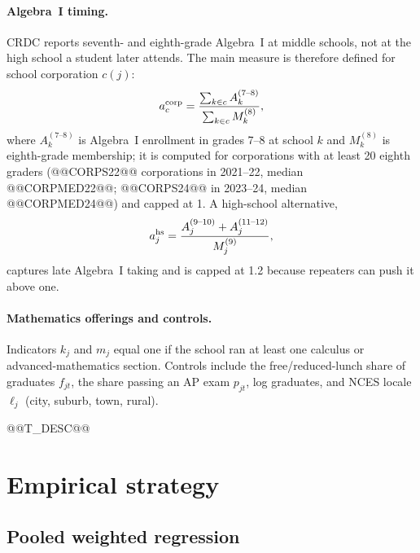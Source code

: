 \documentclass[aps,prd,reprint,superscriptaddress,nofootinbib,floatfix]{revtex4-2}
\begin{document}
\paragraph*{Algebra~I timing.} CRDC reports seventh- and eighth-grade Algebra~I at middle schools, not at the high school a student later attends. The main measure is therefore defined for school corporation $c(j)$:
\begin{equation}
a^{\rm corp}_{c}=\frac{\sum_{k\in c}A^{(7\text{--}8)}_{k}}{\sum_{k\in c}M^{(8)}_{k}},\label{eq:algcorp}
\end{equation}
where $A^{(7\text{--}8)}_k$ is Algebra~I enrollment in grades 7--8 at school $k$ and $M^{(8)}_k$ is eighth-grade membership; it is computed for corporations with at least 20 eighth graders (@@CORPS22@@ corporations in 2021--22, median @@CORPMED22@@; @@CORPS24@@ in 2023--24, median @@CORPMED24@@) and capped at 1. A high-school alternative,
\begin{equation}
a^{\rm hs}_{j}=\frac{A^{(9\text{--}10)}_{j}+A^{(11\text{--}12)}_{j}}{M^{(9)}_{j}},\label{eq:alghs}
\end{equation}
captures late Algebra~I taking and is capped at 1.2 because repeaters can push it above one.

\paragraph*{Mathematics offerings and controls.} Indicators $k_j$ and $m_j$ equal one if the school ran at least one calculus or advanced-mathematics section. Controls include the free/reduced-lunch share of graduates $f_{jt}$, the share passing an AP exam $p_{jt}$, log graduates, and NCES locale $\ell_j$ (city, suburb, town, rural).

@@T_DESC@@

\section{Empirical strategy}\label{sec:methods}

\subsection{Pooled weighted regression}
\end{document}
